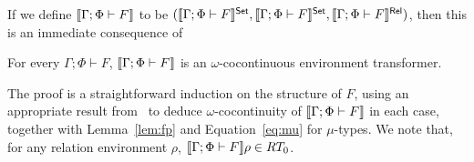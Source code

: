 \documentclass{lmcs}
\theoremstyle{plain}\newtheorem{satz}[thm]{Satz}
\newcommand{\inl}{\mathsf{inl}}
\newcommand{\inr}{\mathsf{inr}}
\begin{document}
{\begin{defi}
\begin{comment}
\hspace*{0.2in} $\lambda t : \relsem{\Gamma;\Phi \vdash
    \Nat^{\ol{\alpha}}\,F\,G}\rho.\, 
  (\lambda \ol{A}. \relsem{\Gamma; \Phi,\ol\alpha \vdash G}f[\ol{\alpha
      := id_A}]) \circ t$  
\item If \,$\Gamma;\Phi \vdash \phi \ol{\tau}$, then
  $\relsem{\Gamma;\Phi \vdash \phi \ol{\tau}} f : \relsem{\Gamma;\Phi
  \vdash \phi \ol{\tau}}\rho \to \relsem{\Gamma;\Phi \vdash \phi
  \ol{\tau}}\rho' = (\rho\phi) \ol{\relsem{\Gamma;\Phi \vdash
    \tau}\rho} \to (\rho'\phi) \ol{\relsem{\Gamma;\Phi \vdash
    \tau}\rho'}$ is defined by $\relsem{\Gamma;\Phi \vdash \phi
  \tau{A}} f = (f\phi)_{\ol{\relsem{\Gamma;\Phi \vdash \tau}\rho'}}
  \,\circ\, (\rho\phi) \ol{\relsem{\Gamma;\Phi \vdash \tau}f} =
  (\rho'\phi) \ol{\relsem{\Gamma;\Phi \vdash \tau}f} \,\circ\, (f
  \phi)_{\ol{\relsem{\Gamma;\Phi \vdash \tau}\rho}}$
\item If\, $\Gamma;\Phi\vdash \sigma + \tau$ then $\relsem{\Gamma;\Phi
  \vdash \sigma + \tau}f$ is defined by $\relsem{\Gamma;\Phi \vdash
  \sigma + \tau}f(\inl\,x) = \inl\,(\relsem{\Gamma;\Phi \vdash
  \sigma}f x)$ and $\relsem{\Gamma;\Phi \vdash \sigma +
  \tau}f(\inr\,y) = \inr\,(\relsem{\Gamma;\Phi \vdash \tau}f y)$
\item If\, $\Gamma;\Phi\vdash \sigma \times \tau$ then
  $\relsem{\Gamma;\Phi \vdash \sigma \times \tau}f =
  \relsem{\Gamma;\Phi \vdash \sigma}f \times \relsem{\Gamma;\Phi
    \vdash \tau}f$
\item If\, $\Gamma;\Phi \vdash (\mu \phi^k.\lambda
  \ol{\alpha}. H)\ol{\tau}$ then $\relsem{\Gamma;\Phi \vdash (\mu
    \phi.\lambda \ol{\alpha}. H)\ol{\tau}} f = (\mu
  T_{H,f})\ol{\relsem{\Gamma;\Phi \vdash \tau}\rho'} \circ (\mu
  T_{H,\rho})\ol{\relsem{\Gamma;\Phi \vdash \tau}f} = (\mu
  T_{H,\rho'})\ol{\relsem{\Gamma;\Phi \vdash \tau}f} \circ (\mu
  T_{H,f})\ol{\relsem{\Gamma;\Phi \vdash \tau}\rho}$
\end{itemize}
\end{comment}
\end{defi}

If we define $\llbracket{\Gamma;\Phi \vdash F}\rrbracket$ to be $(\llbracket{\Gamma;\Phi
  \vdash F}\rrbracket^{\mathsf{Set}}, \llbracket{\Gamma;\Phi \vdash F}\rrbracket^{\mathsf{Set}},\llbracket{\Gamma;\Phi \vdash
  F}\rrbracket^{\mathsf{Rel}})$, then this is an immediate consequence of
\begin{lem}\label{lem:rel-transf-morph}
For every $\Gamma;\Phi \vdash F$, $\llbracket{\Gamma;\Phi \vdash F}\rrbracket$ is an
$\omega$-cocontinuous environment transformer.

\end{lem}
\noindent
The proof is a straightforward induction on the structure of $F$,
using an appropriate result from~\cite{jp19} to deduce
$\omega$-cocontinuity of $\llbracket{\Gamma;\Phi \vdash F}\rrbracket$ in each case,
together with Lemma~\ref{lem:fp} and Equation~\ref{eq:mu} for
$\mu$-types. We note that, for any relation environment $\rho$,  
$\llbracket{\Gamma;\Phi \vdash F}\rrbracket\rho \in RT_0$.

}
\end{document}
